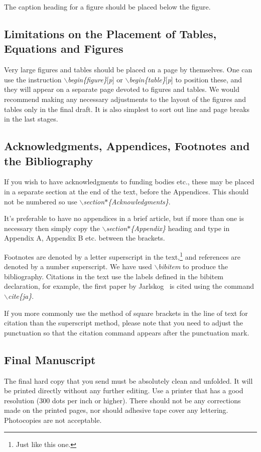 The caption heading for a figure should be placed below
the figure.

\subsection{Limitations on the Placement of Tables, 
Equations and Figures}\label{sec:plac} 
Very large figures and tables should be placed on a page by
themselves. One can use the instruction {\em
$\backslash$begin\{figure\}$[$p$]$} or {\em
$\backslash$begin\{table\}$[$p$]$} to position these,
and they will appear on a separate page devoted to
figures and tables. We would recommend making any
necessary adjustments to the layout of the figures and
tables only in the final draft. It is also simplest to
sort out line and page breaks in the last stages.

\subsection{Acknowledgments, Appendices, Footnotes and the Bibliography}
If you wish to have acknowledgments to funding bodies etc., 
these may be placed in a separate section at the end of the
text, before the Appendices. This should not be numbered so use
{\em $\backslash$section$\ast$\{Acknowledgments\}}.

It's preferable to have no appendices in a brief
article, but if more than one is necessary then simply
copy the {\em $\backslash$section$\ast$\{Appendix\}}
heading and type in Appendix A, Appendix B etc. between
the brackets.

Footnotes are denoted by a letter superscript in the
text,\footnote{Just like this one.} and references are
denoted by a number superscript.  We have used {\em
$\backslash$bibitem} to produce the bibliography.
Citations in the text use the labels defined in the
bibitem declaration, for example, the first paper by
Jarlskog~\cite{ja} is cited using the command {\em
$\backslash$cite\{ja\}}.

If you more commonly use the method of square brackets
in the line of text for citation than the superscript
method, please note that you need to adjust the
punctuation so that the citation command appears after
the punctuation mark.

\subsection{Final Manuscript}
The final hard copy that you send must be absolutely
clean and unfolded.  It will be printed directly without
any further editing. Use a printer that has a good
resolution (300 dots per inch or higher). There should
not be any corrections made on the printed pages, nor
should adhesive tape cover any lettering. Photocopies
are not acceptable.


